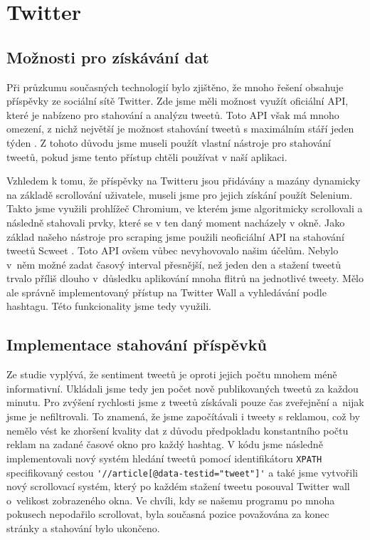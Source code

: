 \section{Twitter}

\subsection{Možnosti pro získávání dat}

Při průzkumu současných technologií bylo zjištěno, že mnoho řešení obsahuje příspěvky ze sociální sítě Twitter. 
Zde jsme měli možnost využít oficiální API, které je nabízeno pro stahování a analýzu tweetů. 
Toto API však má mnoho omezení, z nichž největší je možnost stahování tweetů s maximálním stáří jeden týden \cite{twitter}.
Z tohoto důvodu jsme museli použít vlastní nástroje pro stahování tweetů, pokud jsme tento přístup chtěli používat v naší aplikaci. 

Vzhledem k tomu, že příspěvky na Twitteru jsou přidávány a mazány dynamicky na základě scrollování uživatele, museli jsme pro jejich získání použít Selenium. 
Takto jsme využili prohlížeč Chromium, ve kterém jsme algoritmicky scrollovali a následně stahovali prvky, které se v ten daný moment nacházely v okně. 
Jako základ našeho nástroje pro scraping jsme použili neoficiální API na stahování tweetů Scweet \cite{scweet}.
Toto API ovšem vůbec nevyhovovalo našim účelům. 
Nebylo v~něm možné zadat časový interval přesnější, než jeden den a stažení tweetů trvalo příliš dlouho v~důsledku aplikování mnoha flitrů na jednotlivé tweety. 
Mělo ale správně implementovaný přístup na Twitter Wall a vyhledávání podle hashtagu. 
Této funkcionality jsme tedy využili. 

\subsection{Implementace stahování příspěvků}

Ze studie  \cite{event-driven} vyplývá, že sentiment tweetů je oproti jejich počtu mnohem méně informativní. 
Ukládali jsme tedy jen počet nově publikovaných tweetů za každou minutu. 
Pro zvýšení rychlosti jsme z tweetů získávali pouze čas zveřejnění a~nijak jsme je nefiltrovali. 
To znamená, že jsme započítávali i tweety s reklamou, což by nemělo vést ke zhoršení kvality dat z důvodu předpokladu konstantního počtu reklam na zadané časové okno pro každý hashtag. 
V kódu jsme následně implementovali nový systém hledání tweetů pomocí identifikátoru \verb|XPATH| specifikovaný cestou \verb|'//article[@data-testid="tweet"]'| a také jsme vytvořili nový scrollovací systém, který po každém stažení tweetu posouval Twitter wall o~velikost zobrazeného okna. 
Ve chvíli, kdy se našemu programu po mnoha pokusech nepodařilo scrollovat, byla současná pozice považována za konec stránky a stahování bylo ukončeno. 


